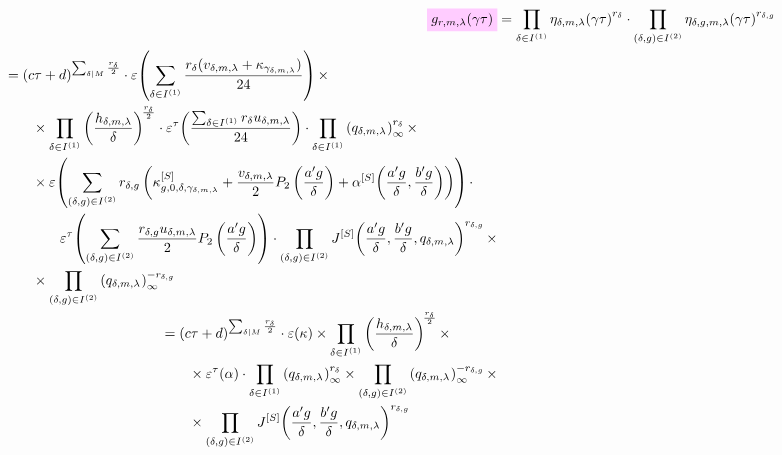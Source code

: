 \documentclass{article}
\begin{document}
\begin{align}
  \defineNotation[g-r-m-lambda-gamma-tau]{g_{r,m,\lambda}(\gamma\tau)}
    &= \prod_{\delta\in I^{(1)}}
          \eta_{\delta,m,\lambda}
            \!\left(\gamma \tau\right)^{r_\delta}
      \cdot
      \prod_{(\delta,g)\in I^{(2)}}
        \eta_{\delta,g,m,\lambda}\!\left(\gamma \tau\right)^{r_{\delta,g}}
    \notag\\
  \begin{split}
  &=
    (c\tau+d)^{\divisorsum{M} \frac{r_\delta}{2}} \cdot
    \unityPower{\sum_{\delta\in I^{(1)}} \frac{r_\delta(v_{\delta,m,\lambda} +
    \kappa_{\gamma_{\delta,m,\lambda}})}{24}} \times\\
  & \qquad\times
    \prod_{\delta\in I^{(1)}}
    \left(\frac{h_{\delta,m,\lambda}}{\delta}\right)^{\!\frac{r_\delta}{2}}
    \cdot
    \unityPowerTau{\frac{\sum_{\delta\in I^{(1)}} r_\delta u_{\delta,m,\lambda}}{24}}
    \cdot
    \prod_{\delta\in I^{(1)}}
    \eulerFunction[q_{\delta,m,\lambda}]{}^{r_\delta}
    \times\\
  & \qquad\times
    \unityPower{
    \sum_{(\delta,g)\in I^{(2)}}
      r_{\delta,g}\left(\kappa_{g,0,\delta,\gamma_{\delta,m,\lambda}}^{[S]}
      +
      \frac{v_{\delta,m,\lambda}}{2} P_2\left(\frac{a' g}{\delta}\right)
      +
      \alphaSchoenebergContribution{\frac{a' g}{\delta}}{\frac{b' g}{\delta}}
      \right)
    }
    \cdot
    \\
    &\qquad\qquad
    \unityPowerTau{
    \sum_{(\delta,g)\in I^{(2)}}
    \frac{r_{\delta,g} u_{\delta,m,\lambda}}{2} P_2\left(\frac{a' g}{\delta}\right)}
    \cdot
    \prod_{(\delta,g)\in I^{(2)}}
    \jacobiSchoeneberg{\frac{a' g}{\delta}}{\frac{b' g}{\delta}}{q_{\delta,m,\lambda}}^{r_{\delta,g}}
    \times\\
  & \qquad\times
  \prod_{(\delta,g)\in I^{(2)}}
  \eulerFunction[q_{\delta,m,\lambda}]{}^{-r_{\delta,g}}
\end{split}
    \notag\\
  \begin{split}
  &=
    (c\tau+d)^{\divisorsum{M} \frac{r_\delta}{2}} \cdot
    \unityPower{\kappa}
    \times
    \prod_{\delta\in I^{(1)}}
    \left(\frac{h_{\delta,m,\lambda}}{\delta}\right)^{\!\frac{r_\delta}{2}}
    \times
    \\
    &\qquad \times
    \unityPowerTau{\alpha}
    \cdot
    \prod_{\delta\in I^{(1)}}
    \eulerFunction[q_{\delta,m,\lambda}]{}^{r_\delta}
    \times
    \prod_{(\delta,g)\in I^{(2)}}
    \eulerFunction[q_{\delta,m,\lambda}]{}^{-r_{\delta,g}}
    \times
    \\
    & \qquad\times
    \prod_{(\delta,g)\in I^{(2)}}
    \jacobiSchoeneberg{\frac{a' g}{\delta}}{\frac{b' g}{\delta}}{q_{\delta,m,\lambda}}^{r_{\delta,g}}
  \end{split}
  \label{eq:g_r-m-lambda(gamma*tau)}
\end{align}
\end{document}
